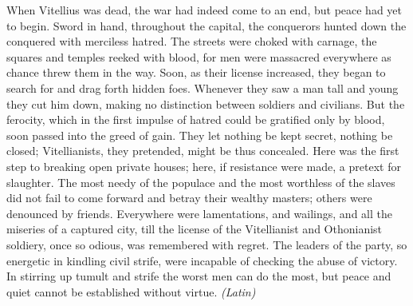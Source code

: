 
When Vitellius was dead, the war had indeed come to an end, but peace had yet to begin. Sword in hand, throughout the capital, the conquerors hunted down the conquered with merciless hatred. The streets were choked with carnage, the squares and temples reeked with blood, for men were massacred everywhere as chance threw them in the way. Soon, as their license increased, they began to search for and drag forth hidden foes. Whenever they saw a man tall and young they cut him down, making no distinction between soldiers and civilians. But the ferocity, which in the first impulse of hatred could be gratified only by blood, soon passed into the greed of gain. They let nothing be kept secret, nothing be closed; Vitellianists, they pretended, might be thus concealed. Here was the first step to breaking open private houses; here, if resistance were made, a pretext for slaughter. The most needy of the populace and the most worthless of the slaves did not fail to come forward and betray their wealthy masters; others were denounced by friends. Everywhere were lamentations, and wailings, and all the miseries of a captured city, till the license of the Vitellianist and Othonianist soldiery, once so odious, was remembered with regret. The leaders of the party, so energetic in kindling civil strife, were incapable of checking the abuse of victory. In stirring up tumult and strife the worst men can do the most, but peace and quiet cannot be established without virtue. \emph{(Latin)}


